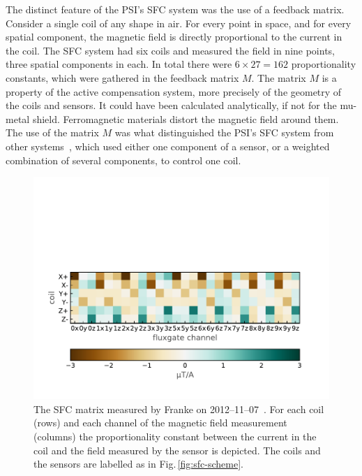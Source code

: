 
The distinct feature of the PSI's SFC system was the use of a feedback matrix. Consider a single coil of any shape in air. For every point in space, and for every spatial component, the magnetic field is directly proportional to the current in the coil. The SFC system had six coils and measured the field in nine points, three spatial components in each. In total there were $6 \times 27 = 162$ proportionality constants, which were gathered in the feedback matrix $M$. The matrix $M$ is a property of the active compensation system, more precisely of the geometry of the coils and sensors. It could have been calculated analytically, if not for the mu-metal shield. Ferromagnetic materials distort the magnetic field around them. The use of the matrix $M$ was what distinguished the PSI's SFC system from other systems~\cite{Kelha1982,Brake1991,Spemann2003,Brys2005,Kobayashi2012,Voigt2013}, which used either one component of a sensor, or a weighted combination of several components, to control one coil.



\begin{figure}
  \centering
  \includegraphics[width=.8\linewidth]{gfx/nEDM_SFC/nEDM_SFC_matrix.pdf}
  \caption{The SFC matrix measured by Franke on 2012--11--07~\cite{Franke2013}. For each coil (rows) and each channel of the magnetic field measurement (columns) the proportionality constant between the current in the coil and the field measured by the sensor is depicted. The coils and the sensors are labelled as in Fig.\,\ref{fig:sfc-scheme}.}\label{fig:nEDM_SFC_matrix}
\end{figure}

